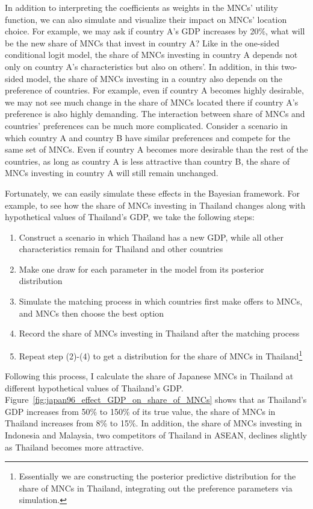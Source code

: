 In addition to interpreting the coefficients as weights in the MNCs' utility
function, we can also simulate and visualize their impact on MNCs' location
choice. For example, we may ask if country A's GDP increases by 20\%, what will
be the new share of MNCs that invest in country A? Like in the one-sided
conditional logit model, the share of MNCs investing in country A depends not
only on country A's characteristics but also on others'. In addition, in this
two-sided model, the share of MNCs investing in a country also depends on the
preference of countries. For example, even if country A becomes highly
desirable, we may not see much change in the share of MNCs located there if
country A's preference is also highly demanding. The interaction between share
of MNCs and countries' preferences can be much more complicated. Consider a
scenario in which country A and country B have similar preferences and compete
for the same set of MNCs. Even if country A becomes more desirable than the rest
of the countries, as long as country A is less attractive than country B, the
share of MNCs investing in country A will still remain unchanged.

Fortunately, we can easily simulate these effects in the Bayesian framework. For
example, to see how the share of MNCs investing in Thailand changes along with
hypothetical values of Thailand's GDP, we take the following steps:

\begin{enumerate}
\item Construct a scenario in which Thailand has a new GDP, while all other
  characteristics remain for Thailand and other countries
\item Make one draw for each parameter in the model from its posterior
  distribution
\item Simulate the matching process in which countries first make offers to
  MNCs, and MNCs then choose the best option
\item Record the share of MNCs investing in Thailand after the matching process
\item Repeat step (2)-(4) to get a distribution for the share of MNCs in
  Thailand\footnote{Essentially we are constructing the posterior predictive
    distribution for the share of MNCs in Thailand, integrating out the
    preference parameters via simulation.}
\end{enumerate}

Following this process, I calculate the share of Japanese MNCs in Thailand at
different hypothetical values of Thailand's GDP.
Figure~\ref{fig:japan96_effect_GDP_on_share_of_MNCs} shows that as Thailand's
GDP increases from 50\% to 150\% of its true value, the share of MNCs in
Thailand increases from 8\% to 15\%. In addition, the share of MNCs investing in
Indonesia and Malaysia, two competitors of Thailand in ASEAN, declines slightly
as Thailand becomes more attractive.

